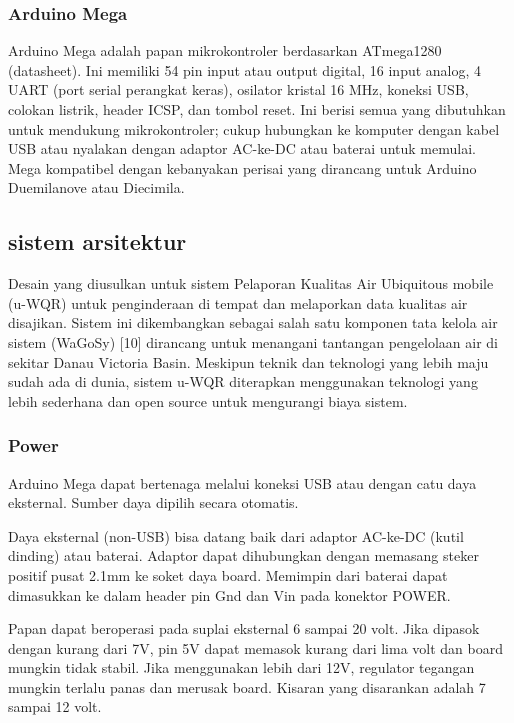 \subsubsection{Arduino Mega}
Arduino Mega adalah papan mikrokontroler berdasarkan ATmega1280 (datasheet). Ini memiliki 54 pin input atau output digital, 16 input analog, 4 UART (port serial perangkat keras), osilator kristal 16 MHz, koneksi USB, colokan listrik, header ICSP, dan tombol reset. Ini berisi semua yang dibutuhkan untuk mendukung mikrokontroler; cukup hubungkan ke komputer dengan kabel USB atau nyalakan dengan adaptor AC-ke-DC atau baterai untuk memulai. Mega kompatibel dengan kebanyakan perisai yang dirancang untuk Arduino Duemilanove atau Diecimila.

\subsection{sistem arsitektur}
Desain yang diusulkan untuk sistem Pelaporan Kualitas Air Ubiquitous mobile (u-WQR) untuk penginderaan di tempat
dan melaporkan data kualitas air disajikan. Sistem ini dikembangkan sebagai salah satu komponen tata kelola air
sistem (WaGoSy) [10] dirancang untuk menangani tantangan pengelolaan air di sekitar Danau Victoria Basin.
Meskipun teknik dan teknologi yang lebih maju sudah ada di dunia, sistem u-WQR diterapkan
menggunakan teknologi yang lebih sederhana dan open source untuk mengurangi biaya sistem.

\subsubsection{Power}
Arduino Mega dapat bertenaga melalui koneksi USB atau dengan catu daya eksternal. Sumber daya dipilih secara otomatis.

Daya eksternal (non-USB) bisa datang baik dari adaptor AC-ke-DC (kutil dinding) atau baterai. Adaptor dapat dihubungkan dengan memasang steker positif pusat 2.1mm ke soket daya board. Memimpin dari baterai dapat dimasukkan ke dalam header pin Gnd dan Vin pada konektor POWER.

Papan dapat beroperasi pada suplai eksternal 6 sampai 20 volt. Jika dipasok dengan kurang dari 7V, pin 5V dapat memasok kurang dari lima volt dan board mungkin tidak stabil. Jika menggunakan lebih dari 12V, regulator tegangan mungkin terlalu panas dan merusak board. Kisaran yang disarankan adalah 7 sampai 12 volt.

